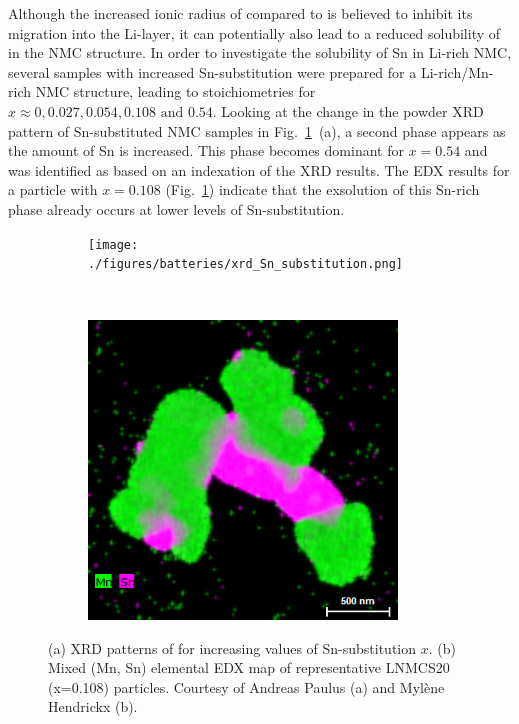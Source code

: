 \begin{refsection}
Although the increased ionic radius of  compared to  
is believed to inhibit its migration into the Li-layer, it can potentially 
also lead to a reduced solubility of  in the NMC structure. In order to 
investigate the solubility of Sn in Li-rich NMC, several samples with 
increased Sn-substitution were prepared for a Li-rich/Mn-rich NMC structure, 
leading to stoichiometries  
for $x  \approx 0, 0.027, 0.054, 0.108 \textrm{ and } 0.54$. Looking at the 
change in the powder XRD pattern of Sn-substituted NMC samples in 
Fig.~\ref{batteries:fig-Sn_experiment}~(a), a second phase appears as the 
amount of Sn is increased. This phase becomes dominant for $x=0.54$ and was 
identified as  based on an indexation of the XRD results. 
The EDX results for a particle with $x=0.108$ 
(Fig.~\ref{batteries:fig-Sn_experiment}) indicate that the exsolution of this 
Sn-rich phase already occurs at lower levels of Sn-substitution. 
 
\begin{figure}[ht] 
    \centering
    \captionsetup{width=0.92\linewidth}
    \begin{subfigure}[t]{0.65\textwidth} 
        \centering 
        \texttt{[image: ./figures/batteries/xrd\_Sn\_substitution.png]} 
        \caption{} 
    \end{subfigure}%
    ~  
    \begin{subfigure}[t]{0.34\textwidth} 
        \centering 
        \includegraphics[width=0.9\textwidth]{./figures/batteries/edx_Sn_substitution.png} 
        \caption{} 
    \end{subfigure} 
    \caption{(a) XRD patterns of 
 for increasing values of 
Sn-substitution $x$. (b) Mixed (Mn, Sn) elemental EDX map of representative 
LNMCS20 (x=0.108) particles. Courtesy of Andreas Paulus (a) and Myl\`ene 
Hendrickx (b).} 
    \label{batteries:fig-Sn_experiment} 
\end{figure} 
 

\end{refsection}
